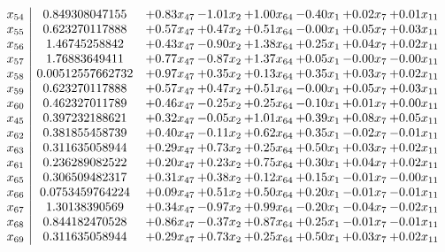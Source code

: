 \documentclass[8pt]{article}
\begin{document}
\[\begin{array}{c| c c@{\hskip 2pt} c@{\hskip 2pt} c@{\hskip 2pt} c@{\hskip 2pt} c@{\hskip 2pt} c@{\hskip 2pt} }
 x_{54}   &  0.849308047155 & +  0.83 x_{47} & -1.01 x_{2} & +  1.00 x_{64} & -0.40 x_{1} & +  0.02 x_{7} & +  0.01 x_{11}\\
 x_{55}   &  0.623270117888 & +  0.57 x_{47} & +  0.47 x_{2} & +  0.51 x_{64} & -0.00 x_{1} & +  0.05 x_{7} & +  0.03 x_{11}\\
 x_{56}   &  1.46745258842 & +  0.43 x_{47} & -0.90 x_{2} & +  1.38 x_{64} & +  0.25 x_{1} & +  0.04 x_{7} & +  0.02 x_{11}\\
 x_{57}   &  1.76883649411 & +  0.77 x_{47} & -0.87 x_{2} & +  1.37 x_{64} & +  0.05 x_{1} & -0.00 x_{7} & -0.00 x_{11}\\
 x_{58}   &  0.00512557662732 & +  0.97 x_{47} & +  0.35 x_{2} & +  0.13 x_{64} & +  0.35 x_{1} & +  0.03 x_{7} & +  0.02 x_{11}\\
 x_{59}   &  0.623270117888 & +  0.57 x_{47} & +  0.47 x_{2} & +  0.51 x_{64} & -0.00 x_{1} & +  0.05 x_{7} & +  0.03 x_{11}\\
 x_{60}   &  0.462327011789 & +  0.46 x_{47} & -0.25 x_{2} & +  0.25 x_{64} & -0.10 x_{1} & +  0.01 x_{7} & +  0.00 x_{11}\\
 x_{45}   &  0.397232188621 & +  0.32 x_{47} & -0.05 x_{2} & +  1.01 x_{64} & +  0.39 x_{1} & +  0.08 x_{7} & +  0.05 x_{11}\\
 x_{62}   &  0.381855458739 & +  0.40 x_{47} & -0.11 x_{2} & +  0.62 x_{64} & +  0.35 x_{1} & -0.02 x_{7} & -0.01 x_{11}\\
 x_{63}   &  0.311635058944 & +  0.29 x_{47} & +  0.73 x_{2} & +  0.25 x_{64} & +  0.50 x_{1} & +  0.03 x_{7} & +  0.02 x_{11}\\
 x_{61}   &  0.236289082522 & +  0.20 x_{47} & +  0.23 x_{2} & +  0.75 x_{64} & +  0.30 x_{1} & +  0.04 x_{7} & +  0.02 x_{11}\\
 x_{65}   &  0.306509482317 & +  0.31 x_{47} & +  0.38 x_{2} & +  0.12 x_{64} & +  0.15 x_{1} & -0.01 x_{7} & -0.00 x_{11}\\
 x_{66}   &  0.0753459764224 & +  0.09 x_{47} & +  0.51 x_{2} & +  0.50 x_{64} & +  0.20 x_{1} & -0.01 x_{7} & -0.01 x_{11}\\
 x_{67}   &  1.30138390569 & +  0.34 x_{47} & -0.97 x_{2} & +  0.99 x_{64} & -0.20 x_{1} & -0.04 x_{7} & -0.02 x_{11}\\
 x_{68}   &  0.844182470528 & +  0.86 x_{47} & -0.37 x_{2} & +  0.87 x_{64} & +  0.25 x_{1} & -0.01 x_{7} & -0.01 x_{11}\\
 x_{69}   &  0.311635058944 & +  0.29 x_{47} & +  0.73 x_{2} & +  0.25 x_{64} & +  0.50 x_{1} & +  0.03 x_{7} & +  0.02 x_{11}\\

\end{array}\]
\end{document}
